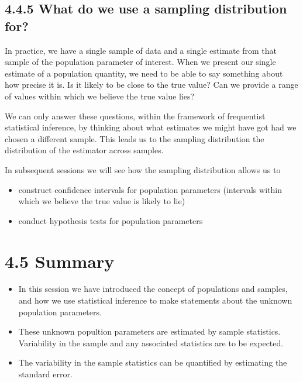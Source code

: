 \documentclass[letterpaper,10pt,english]{jupyterBook}
\begin{document}
\noindent{}


\subsection{4.4.5 What do we use a sampling distribution for?}
\label{\detokenize{04.e. Population.and.samples:what-do-we-use-a-sampling-distribution-for}}
\sphinxAtStartPar
In practice, we have a single sample of data and a single estimate from that sample of the population parameter of interest.  When we present our single estimate of a population quantity, we need to be able to say something about how precise it is. Is it likely to be close to the true value? Can we provide a range of values within which we believe the true value lies?

\sphinxAtStartPar
We can only answer these questions, within the framework of frequentist statistical inference, by thinking about what estimates we might have got had we chosen a different sample. This leads us to the sampling distribution \sphinxhyphen{} the distribution of the estimator across samples.

\sphinxAtStartPar
In subsequent sessions we will see how the sampling distribution allows us to
\begin{itemize}
\item {} 
\sphinxAtStartPar
construct confidence intervals for population parameters (intervals within which we believe the true value is likely to lie)

\item {} 
\sphinxAtStartPar
conduct hypothesis tests for population parameters

\end{itemize}


\section{4.5 Summary}
\label{\detokenize{04.f. Population.and.samples:summary}}\label{\detokenize{04.f. Population.and.samples::doc}}\begin{itemize}
\item {} 
\sphinxAtStartPar
In this session we have introduced the concept of populations and samples, and how we use statistical inference to make statements about the unknown population parameters.

\item {} 
\sphinxAtStartPar
These unknown popultion parameters are estimated by sample statistics. Variability in the sample and any associated statistics are to be expected.

\item {} 
\sphinxAtStartPar
The variability in the sample statistics can be quantified by estimating the standard error.

\end{itemize}
\end{document}
